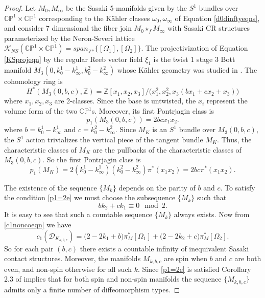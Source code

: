 \documentclass[12pt]{amsart}
\def\bbc{{\mathbb C}}
\def\bbp{{\mathbb P}}
\def\bbz{{\mathbb Z}}
\def\gro{\omega}
\def\grO{\Omega}
\def\cald{{\mathcal D}}
\def\calk{{\mathcal K}}
\begin{document}
\begin{proof}
Let $M_0,M_\infty$ be the Sasaki 5-manifolds given by the $S^1$ bundles over $\bbc\bbp^1\times \bbc\bbp^1$ corresponding to the K\"ahler classes $\gro_0,\gro_\infty$ of Equation \eqref{d0dinftyeqns}, and consider 7 dimensional  the fiber join $M_0\star_f M_\infty$ with Sasaki CR structures parameterized by the Neron-Severi lattice $\calk_{NS}(\bbc\bbp^1\times \bbc\bbp^1)=span_{\bbz^+}\{[\grO_1],[\grO_2]\}$. 
The projectivization of Equation \eqref{KSprojeqn} by the regular Reeb vector field $\xi_1$ is the twist 1 stage 3 Bott manifold $M_3(0,k^1_0-k^1_\infty,k^2_0-k^2_\infty)$ whose K\"ahler geometry was studied in \cite{BoCaTo17}. The cohomology ring is
$$H^*(M_3(0,b,c),\bbz)=\bbz[x_1,x_2,x_3]/\bigl(x_1^2,x_2^2,x_3(bx_1+cx_2+x_3)\bigr)$$
where $x_1,x_2,x_3$ are 2-classes. Since the base is untwisted, the $x_i$ represent the volume form of the two $\bbc\bbp^1$s. Moreover, its first Pontrjagin class  is 
\begin{equation}\label{p1}
p_1(M_3(0,b,c))=2bcx_1x_2.
\end{equation}
where $b=k^1_0-k^1_\infty$ and $c=k^2_0-k^2_\infty$. Since $M_K$ is an $S^1$ bundle over $M_3(0,b,c)$, the $S^1$ action trivializes the vertical piece of the tangent bundle $M_K$. Thus, the characteristic classes of $M_K$ are the pullbacks of the characteristic classes of $M_3(0,b,c)$. So the first Pontrjagin class is
\begin{equation}\label{2p1}
p_1(M_K)=2(k^1_0-k^1_\infty)(k^2_0-k^2_\infty)\pi^*(x_1x_2)=2bc\pi^*(x_1x_2).
\end{equation}


The existence of the sequence $\{M_k\}$ depends on the parity of $b$ and $c$. To satisfy the condition \eqref{p1=2e} we must choose the subsequence $\{M_k\}$ such that 
\begin{equation}\label{pe}
bk_2+ck_1\equiv 0\mod 2. 
\end{equation}
It is easy to see that such a countable sequence $\{M_k\}$ always exists. Now from \eqref{c1noncoeqn} we have
\begin{equation}\label{c1kl}
c_1(\cald_{K_{k,b,c}})=\bigl(2-2k_1+b\bigr)\pi^*_M[\grO_1] +\bigl(2-2k_2+c\bigr)\pi^*_M[\grO_2].
\end{equation}
So for each pair $(b,c)$ there exists a countable infinity of inequivalent Sasaki contact structures. Moreover, the manifolds $M_{k,b,c}$ are spin when $b$ and $c$ are both even, and non-spin otherwise for all such $k$. Since \eqref{p1=2e} is satisfied Corollary 2.3 of \cite{KrTr91} implies that for both spin and non-spin manifolds the sequence $\{M_{k,b,c}\}$ admits only a finite number of diffeomorphism types.
\end{proof}
\end{document}

